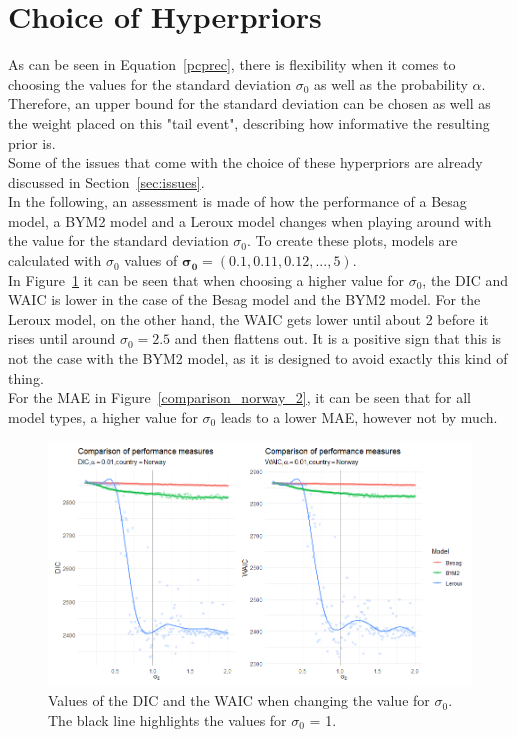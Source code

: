 \section{Choice of Hyperpriors}\label{sec:hyperprios}
As can be seen in Equation~\ref{pcprec}, there is flexibility when it comes to choosing the values for the standard deviation $\sigma_0$ as well as the probability $\alpha$. Therefore, an upper bound for the standard deviation can be chosen as well as the weight placed on this "tail event", describing how informative the resulting prior is. \\
Some of the issues that come with the choice of these hyperpriors are already discussed in Section~\ref{sec:issues}. \\
In the following, an assessment is made of how the performance of a Besag model, a BYM2 model and a Leroux model changes when playing around with the value for the standard deviation $\sigma_0$. To create these plots, models are calculated with $\sigma_0$ values of $\pmb{\sigma_0}=\left(0.1,0.11,0.12,...,5\right)$.\\
In Figure~\ref{comparison_norway_1} it can be seen that when choosing a higher value for $\sigma_0$, the DIC and WAIC is lower in the case of the Besag model and the BYM2 model. For the Leroux model, on the other hand, the WAIC gets lower until about 2 before it rises until around $\sigma_0 = 2.5$ and then flattens out. It is a positive sign that this is not the case with the BYM2 model, as it is designed to avoid exactly this kind of thing. \\
For the MAE in Figure~\ref{comparison_norway_2}, it can be seen that for all model types, a higher value for $\sigma_0$ leads to a lower MAE, however not by much.
\begin{figure}[H]
  \centering
  \includegraphics[width = \textwidth]{comparison_1_norway.png}
  \caption{Values of the DIC and the WAIC when changing the value for $\sigma_0$. The black line highlights the values for $\sigma_0$ = 1.}
  \label{comparison_norway_1}
\end{figure}
